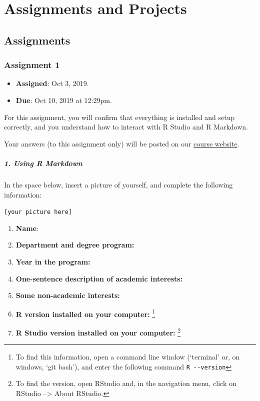 \documentclass[]{book}
\providecommand{\tightlist}{%
  \setlength{\itemsep}{0pt}\setlength{\parskip}{0pt}}
\let\rmarkdownfootnote\footnote%
\def\footnote{\protect\rmarkdownfootnote}
\begin{document}
\part{Assignments and
Projects}\label{part-assignments-and-projects}

\chapter{Assignments}\label{assignments-1}

\section{Assignment 1}\label{assignment-1}

\begin{itemize}
\tightlist
\item
  \textbf{Assigned}: Oct 3, 2019.
\item
  \textbf{Due}: Oct 10, 2019 at 12:29pm.
\end{itemize}

For this assignment, you will confirm that everything is installed and
setup correctly, and you understand how to interact with R Studio and R
Markdown.

Your answers (to this assignment only) will be posted on our
\href{https://github.com/rochelleterman/plsc-31101}{course website}.

\subsubsection*{1. Using R Markdown}\label{using-r-markdown}

In the space below, insert a picture of yourself, and complete the
following information:

\texttt{{[}your\ picture\ here{]}}

\begin{enumerate}
\def\labelenumi{\arabic{enumi}.}
\tightlist
\item
  \textbf{Name}:
\item
  \textbf{Department and degree program:}
\item
  \textbf{Year in the program:}
\item
  \textbf{One-sentence description of academic interests:}
\item
  \textbf{Some non-academic interests:}
\item
  \textbf{R version installed on your computer:} \footnote{To find this
    information, open a command line window (`terminal' or, on windows,
    `git bash'), and enter the following command \texttt{R\ -\/-version}}
\item
  \textbf{R Studio version installed on your computer:} \footnote{To
    find the version, open RStudio and, in the navigation menu, click on
    RStudio --\textgreater{} About RStudio.}
\end{enumerate}
\end{document}
